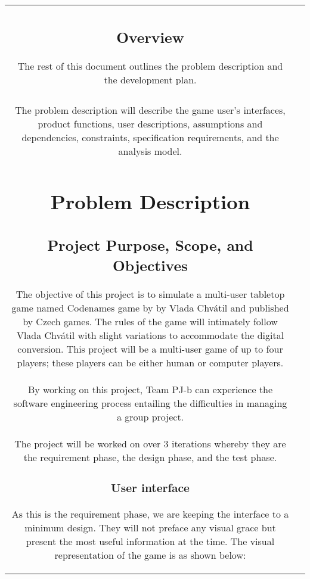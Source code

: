 \documentclass[10pt, a4paper]{article}
\begin{document}
\begin{table}[htbp]
\begin{center}
\begin{tabular}{| c | c |}
	
	\subsection{Overview}
	
	The rest of this document outlines the problem description and the development plan. \\ 
	\\  
	The problem description will describe the game user's interfaces, product functions, user descriptions, assumptions and dependencies, constraints, specification requirements, and the analysis model. \\  
	
	\clearpage
	
\section{Problem Description}

	\subsection{Project Purpose, Scope, and Objectives}
	
	The objective of this project is to simulate a multi-user tabletop game named Codenames game by by Vlada Chv\'atil and published by Czech games. The rules of the game will intimately follow Vlada Chv\'atil with slight variations to accommodate the digital conversion. This project will be a multi-user game of up to four players; these players can be either human or computer players.\\
	
	By working on this project, Team PJ-b can experience the software engineering process entailing the difficulties in managing a group project.\\
	
	The project will be worked on over 3 iterations whereby they are the requirement phase, the design phase, and the test phase.
	
		\subsubsection{User interface}
		
		As this is the requirement phase, we are keeping the interface to a minimum design. They will not preface any visual grace but present the most useful information at the time. The visual representation of the game is as shown below:\\
		

\end{tabular}
\end{center}
\end{table}
\end{document}
